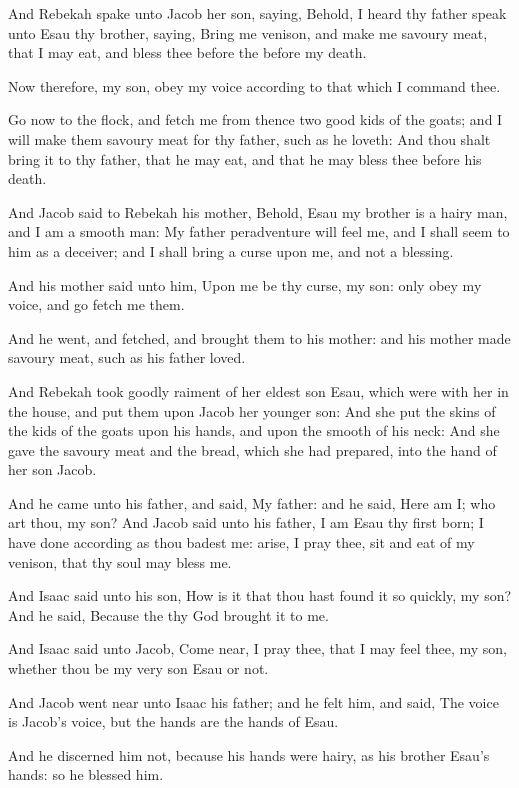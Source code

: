 \verse And Rebekah spake unto Jacob her son, saying, Behold, I heard thy father speak unto Esau thy brother, saying, \verse Bring me venison, and make me savoury meat, that I may eat, and bless thee before the \LORD before my death.

\verse Now therefore, my son, obey my voice according to that which I command thee.

\verse Go now to the flock, and fetch me from thence two good kids of the goats; and I will make them savoury meat for thy father, such as he loveth: \verse And thou shalt bring it to thy father, that he may eat, and that he may bless thee before his death.

\verse And Jacob said to Rebekah his mother, Behold, Esau my brother is a hairy man, and I am a smooth man: \verse My father peradventure will feel me, and I shall seem to him as a deceiver; and I shall bring a curse upon me, and not a blessing.

\verse And his mother said unto him, Upon me be thy curse, my son: only obey my voice, and go fetch me them.

\verse And he went, and fetched, and brought them to his mother: and his mother made savoury meat, such as his father loved.

\verse And Rebekah took goodly raiment of her eldest son Esau, which were with her in the house, and put them upon Jacob her younger son: \verse And she put the skins of the kids of the goats upon his hands, and upon the smooth of his neck: \verse And she gave the savoury meat and the bread, which she had prepared, into the hand of her son Jacob.

\verse And he came unto his father, and said, My father: and he said, Here am I; who art thou, my son?  \verse And Jacob said unto his father, I am Esau thy first born; I have done according as thou badest me: arise, I pray thee, sit and eat of my venison, that thy soul may bless me.

\verse And Isaac said unto his son, How is it that thou hast found it so quickly, my son? And he said, Because the \LORD thy God brought it to me.

\verse And Isaac said unto Jacob, Come near, I pray thee, that I may feel thee, my son, whether thou be my very son Esau or not.

\verse And Jacob went near unto Isaac his father; and he felt him, and said, The voice is Jacob's voice, but the hands are the hands of Esau.

\verse And he discerned him not, because his hands were hairy, as his brother Esau's hands: so he blessed him.

